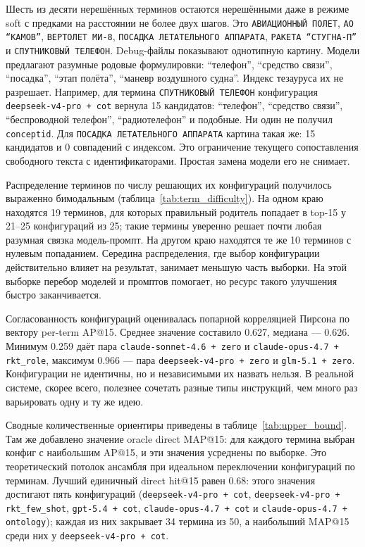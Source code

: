 \documentclass[12pt,a4paper,oneside,openany]{report}
\begin{document}
Шесть из десяти нерешённых терминов остаются нерешёнными даже в режиме soft с предками на расстоянии не более двух шагов. Это \texttt{АВИАЦИОННЫЙ ПОЛЕТ}, \texttt{АО ``КАМОВ''}, \texttt{ВЕРТОЛЕТ МИ-8}, \texttt{ПОСАДКА ЛЕТАТЕЛЬНОГО АППАРАТА}, \texttt{РАКЕТА ``СТУГНА-П''} и \texttt{СПУТНИКОВЫЙ ТЕЛЕФОН}. Debug-файлы показывают однотипную картину. Модели предлагают разумные родовые формулировки: ``телефон'', ``средство связи'', ``посадка'', ``этап полёта'', ``маневр воздушного судна''. Индекс тезауруса их не разрешает. Например, для термина \texttt{СПУТНИКОВЫЙ ТЕЛЕФОН} конфигурация \texttt{deepseek-v4-pro + cot} вернула 15 кандидатов: ``телефон'', ``средство связи'', ``беспроводной телефон'', ``радиотелефон'' и подобные. Ни один не получил \texttt{conceptid}. Для \texttt{ПОСАДКА ЛЕТАТЕЛЬНОГО АППАРАТА} картина такая же: 15 кандидатов и 0 совпадений с индексом. Это ограничение текущего сопоставления свободного текста с идентификаторами. Простая замена модели его не снимает.

Распределение терминов по числу решающих их конфигураций получилось выраженно бимодальным (таблица~\ref{tab:term_difficulty}). На одном краю находятся 19 терминов, для которых правильный родитель попадает в top-15 у 21--25 конфигураций из 25; такие термины уверенно решает почти любая разумная связка модель-промпт. На другом краю находятся те же 10 терминов с нулевым попаданием. Середина распределения, где выбор конфигурации действительно влияет на результат, занимает меньшую часть выборки. На этой выборке перебор моделей и промптов помогает, но ресурс такого улучшения быстро заканчивается.

Согласованность конфигураций оценивалась попарной корреляцией Пирсона по вектору per-term AP@15. Среднее значение составило 0.627, медиана — 0.626. Минимум 0.259 даёт пара \texttt{claude-sonnet-4.6 + zero} и \texttt{claude-opus-4.7 + rkt\_role}, максимум 0.966 — пара \texttt{deepseek-v4-pro + zero} и \texttt{glm-5.1 + zero}. Конфигурации не идентичны, но и независимыми их назвать нельзя. В реальной системе, скорее всего, полезнее сочетать разные типы инструкций, чем много раз варьировать одну и ту же идею.

Сводные количественные ориентиры приведены в таблице~\ref{tab:upper_bound}. Там же добавлено значение oracle direct MAP@15: для каждого термина выбран конфиг с наибольшим AP@15, и эти значения усреднены по выборке. Это теоретический потолок ансамбля при идеальном переключении конфигураций по терминам. Лучший единичный direct hit@15 равен 0.68: этого значения достигают пять конфигураций (\texttt{deepseek-v4-pro + cot}, \texttt{deepseek-v4-pro + rkt\_few\_shot}, \texttt{gpt-5.4 + cot}, \texttt{claude-opus-4.7 + cot} и \texttt{claude-opus-4.7 + ontology}); каждая из них закрывает 34 термина из 50, а наибольший MAP@15 среди них у \texttt{deepseek-v4-pro + cot}.
\end{document}
